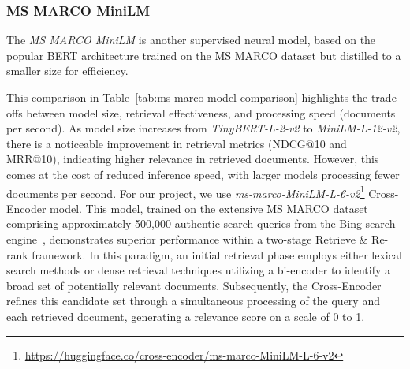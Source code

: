 \subsubsection{MS MARCO MiniLM}
The \textit{MS MARCO MiniLM} is another supervised neural model, based on the popular BERT architecture trained on the MS MARCO dataset but distilled to a smaller size for efficiency.
\begin{table}[ht!]
    \centering
    \noindent
    \caption{Performance comparison of various distilled MS MARCO models based on BERT architecture, measured across NDCG@10 on TREC DL 2019 and MRR@10 on MS MARCO Dev benchmarks.}
    \label{tab:ms-marco-model-comparison}
\end{table}
This comparison in Table~\ref{tab:ms-marco-model-comparison} highlights the trade-offs between model size, retrieval effectiveness, and processing speed (documents per second).
As model size increases from \textit{TinyBERT-L-2-v2} to \textit{MiniLM-L-12-v2}, there is a noticeable improvement in retrieval metrics (NDCG@10 and MRR@10), indicating higher relevance in retrieved documents.
However, this comes at the cost of reduced inference speed, with larger models processing fewer documents per second.
For our project, we use \textit{ms-marco-MiniLM-L-6-v2}\footnote{\url{https://huggingface.co/cross-encoder/ms-marco-MiniLM-L-6-v2}} Cross-Encoder model.
This model, trained on the extensive MS MARCO dataset comprising approximately 500,000 authentic search queries from the Bing search engine~\cite{reimers-2019-sentence-bert}, demonstrates superior performance within a two-stage Retrieve \& Re-rank framework.
In this paradigm, an initial retrieval phase employs either lexical search methods or dense retrieval techniques utilizing a bi-encoder to identify a broad set of potentially relevant documents.
Subsequently, the Cross-Encoder refines this candidate set through a simultaneous processing of the query and each retrieved document, generating a relevance score on a scale of 0 to 1.
